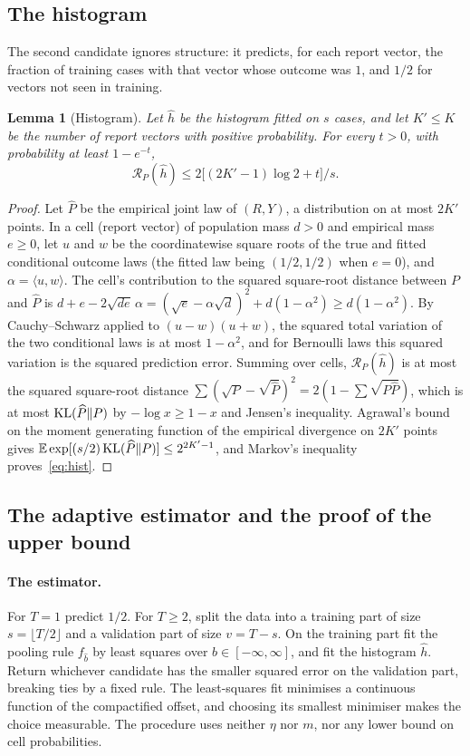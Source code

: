 \documentclass[11pt,a4paper]{article}
\newtheorem{lemma}[theorem]{Lemma}
\theoremstyle{remark}
\newcommand{\KL}{\mathop{\rm KL}\nolimits}
\newcommand{\E}{\mathbb E}
\newcommand{\cR}{\mathcal R}
\begin{document}
\subsection{The histogram}
The second candidate ignores structure: it predicts, for each report vector, the fraction of training cases with that vector whose outcome was $1$, and $1/2$ for vectors not seen in training.

\begin{lemma}[Histogram]\label{lem:hist}
Let $\widehat h$ be the histogram fitted on $s$ cases, and let $K'\le K$ be the number of report vectors with positive probability. For every $t>0$, with probability at least $1-e^{-t}$,
\begin{equation}\label{eq:hist}
 \cR_P(\widehat h)\le 2\big[(2K'-1)\log 2+t\big]/s.
\end{equation}
\end{lemma}
\begin{proof}
Let $\widehat P$ be the empirical joint law of $(R,Y)$, a distribution on at most $2K'$ points. In a cell (report vector) of population mass $d>0$ and empirical mass $e\ge0$, let $u$ and $w$ be the coordinatewise square roots of the true and fitted conditional outcome laws (the fitted law being $(1/2,1/2)$ when $e=0$), and $\alpha=\langle u,w\rangle$. The cell's contribution to the squared square-root distance between $P$ and $\widehat P$ is
$d+e-2\sqrt{de}\,\alpha=(\sqrt e-\alpha\sqrt d)^2+d(1-\alpha^2)\ge d(1-\alpha^2)$. By Cauchy--Schwarz applied to $(u-w)(u+w)$, the squared total variation of the two conditional laws is at most $1-\alpha^2$, and for Bernoulli laws this squared variation is the squared prediction error. Summing over cells, $\cR_P(\widehat h)$ is at most the squared square-root distance $\sum(\sqrt{P}-\sqrt{\widehat P})^2=2(1-\sum\sqrt{P\widehat P})$, which is at most $\KL(\widehat P\|P)$ by $-\log x\ge1-x$ and Jensen's inequality. Agrawal's bound~\cite[Theorem~I.3]{agrawal} on the moment generating function of the empirical divergence on $2K'$ points gives $\E\exp[(s/2)\KL(\widehat P\|P)]\le 2^{2K'-1}$, and Markov's inequality proves~\eqref{eq:hist}.
\end{proof}

\subsection{The adaptive estimator and the proof of the upper bound}\label{sec:adaptive}
\paragraph{The estimator.} For $T=1$ predict $1/2$. For $T\ge2$, split the data into a training part of size $s=\lfloor T/2\rfloor$ and a validation part of size $v=T-s$. On the training part fit the pooling rule $f_{\widehat b}$ by least squares over $b\in[-\infty,\infty]$, and fit the histogram $\widehat h$. Return whichever candidate has the smaller squared error on the validation part, breaking ties by a fixed rule. The least-squares fit minimises a continuous function of the compactified offset, and choosing its smallest minimiser makes the choice measurable. The procedure uses neither $\eta$ nor $m$, nor any lower bound on cell probabilities.
\end{document}
